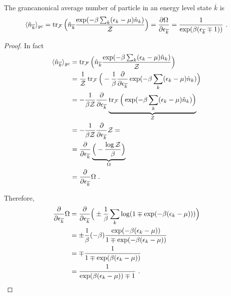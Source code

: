     The grancanonical average number of particle in an energy level state $\overline k$ is 
    \begin{equation*}
        \langle\hat n_{\overline k}\rangle_{gc} = \operatorname{tr}_{\mathcal F} \Big (\hat n_{\overline k} \frac{\exp (-\beta \sum_k (\epsilon_k - \mu) \hat n_k)}{\mathcal Z} \Big) = \frac{\partial\Omega}{\partial\epsilon_{\overline k}} = \frac{1}{\exp(\beta(\epsilon_{\overline k} \mp 1))} ~.
    \end{equation*}
    \begin{proof}
        In fact
        \begin{equation*}
        \begin{aligned}
            \langle\hat n_{\overline k}\rangle_{gc} & = \operatorname{tr}_{\mathcal F} \Big (\hat n_{\overline k} \frac{\exp (-\beta \sum_k (\epsilon_k - \mu) \hat n_k)}{\mathcal Z} \Big) \\ & = \frac{1}{\mathcal Z} \operatorname{tr}_{\mathcal F} \Big (- \frac{1}{\beta} \frac{\partial}{\partial\epsilon_{\overline k}} \exp (-\beta \sum_k (\epsilon_k - \mu) \hat n_k) \Big) \\ & = - \frac{1}{\beta \mathcal Z} \frac{\partial}{\partial\epsilon_{\overline k}} \underbrace{\operatorname{tr}_{\mathcal F} \Big ( \exp (-\beta \sum_k (\epsilon_k - \mu) \hat n_k) \Big)}_{\mathcal Z} \\ & = - \frac{1}{\beta \mathcal Z} \frac{\partial}{\partial\epsilon_{\overline k}} \mathcal Z = \\ & = \frac{\partial}{\partial\epsilon_{\overline k}} \underbrace{\Big ( - \frac{\log \mathcal Z}{\beta} \Big)}_\Omega \\ & = \frac{\partial}{\partial\epsilon_{\overline k}} \Omega ~.
        \end{aligned}
        \end{equation*}

        Therefore, 
        \begin{equation*}
        \begin{aligned}
            \frac{\partial}{\partial\epsilon_{\overline k}} \Omega & = \frac{\partial}{\partial\epsilon_{\overline k}}  \Big (\pm \frac{1}{\beta} \sum_k \log (1 \mp \exp (-\beta (\epsilon_k - \mu)) ) \Big ) \\ & = \pm \frac{1}{\beta} (- \beta) \frac{\exp(- \beta(\epsilon_k - \mu))}{1 \mp \exp(- \beta(\epsilon_k - \mu))} \\ & = \mp \frac{1}{1 \mp \exp(\beta(\epsilon_k - \mu))} \\ & = \frac{1}{\exp(\beta(\epsilon_k - \mu))\mp 1} ~.
        \end{aligned}
        \end{equation*}
    \end{proof}

